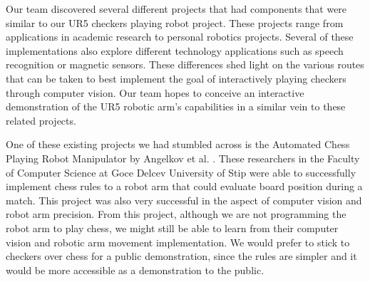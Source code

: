 


Our team discovered several different projects that had components that were similar to our UR5 checkers playing robot project. These projects range from applications in academic research to personal robotics projects. Several of these implementations also explore different technology applications such as speech recognition or magnetic sensors. These differences shed light on the various routes that can be taken to best implement the goal of interactively playing checkers through computer vision. Our team hopes to conceive an interactive demonstration of the UR5 robotic arm's capabilities in a similar vein to these related projects.

One of these existing projects we had stumbled across is the Automated Chess Playing Robot Manipulator by Angelkov et al. \cite{Angelkov2015}. These researchers in the Faculty of Computer Science at Goce Delcev University of Stip were able to successfully implement chess rules to a robot arm that could evaluate board position during a match. This project was also very successful in the aspect of computer vision and robot arm precision. From this project, although we are not programming the robot arm to play chess, we might still be able to learn from their computer vision and robotic arm movement implementation. We would prefer to stick to checkers over chess for a public demonstration, since the rules are simpler and it would be more accessible as a demonstration to the public.

